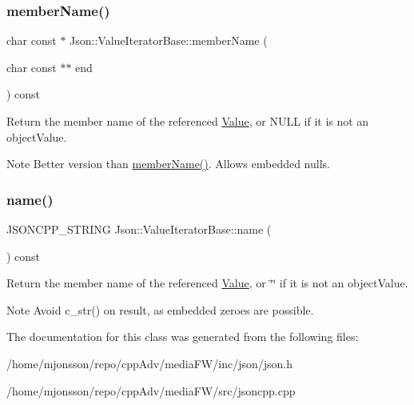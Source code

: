 \subsubsection{\texorpdfstring{member\+Name()}{memberName()}\hspace{0.1cm}{\footnotesize\ttfamily [2/2]}}
{\footnotesize\ttfamily char const  $\ast$ Json\+::\+Value\+Iterator\+Base\+::member\+Name (\begin{DoxyParamCaption}\item[{char const $\ast$$\ast$}]{end }\end{DoxyParamCaption}) const}

Return the member name of the referenced \hyperlink{classJson_1_1Value}{Value}, or N\+U\+LL if it is not an object\+Value. \begin{DoxyNote}{Note}
Better version than \hyperlink{classJson_1_1ValueIteratorBase_a54765da6759fd3f1edcbfbaf308ec263}{member\+Name()}. Allows embedded nulls. 
\end{DoxyNote}
\mbox{\label{classJson_1_1ValueIteratorBase_a522989403c976fdbb94da846b99418db}} 
\subsubsection{\texorpdfstring{name()}{name()}}
{\footnotesize\ttfamily J\+S\+O\+N\+C\+P\+P\+\_\+\+S\+T\+R\+I\+NG Json\+::\+Value\+Iterator\+Base\+::name (\begin{DoxyParamCaption}{ }\end{DoxyParamCaption}) const}

Return the member name of the referenced \hyperlink{classJson_1_1Value}{Value}, or \char`\"{}\char`\"{} if it is not an object\+Value. \begin{DoxyNote}{Note}
Avoid {\ttfamily c\+\_\+str()} on result, as embedded zeroes are possible. 
\end{DoxyNote}


The documentation for this class was generated from the following files\+:\begin{DoxyCompactItemize}
\item 
/home/mjonsson/repo/cpp\+Adv/media\+F\+W/inc/json/json.\+h\item 
/home/mjonsson/repo/cpp\+Adv/media\+F\+W/src/jsoncpp.\+cpp\end{DoxyCompactItemize}
